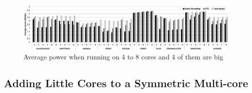 \begin{figure}[t]%
	\centering
	\includegraphics[width=1.0\textwidth]{figures/power4plus.pdf}
	\vspace{-0.5cm}
	\caption{Average power when running on 4 to 8 cores and 4 of them are big}
	\label{fig:power4plus}%
	\vspace{-0.3cm}
\end{figure}




\subsection{Adding Little Cores to a Symmetric Multi-core}

